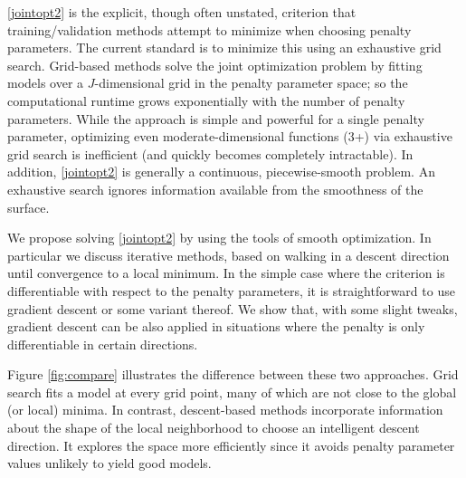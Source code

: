 \documentclass[12pt,letterpaper]{article}
\begin{document}
\eqref{jointopt2} is the explicit, though often unstated, criterion that training/validation methods attempt to minimize when choosing penalty parameters. The current standard is to minimize this using an exhaustive grid search. Grid-based methods solve the joint optimization problem by fitting models over a $J$-dimensional grid in the penalty parameter space; so the computational runtime grows exponentially with the number of penalty parameters. While the approach is simple and powerful for a single penalty parameter, optimizing even moderate-dimensional functions (3+) via exhaustive grid search is inefficient (and quickly becomes completely intractable).  In addition, \eqref{jointopt2} is generally a continuous, piecewise-smooth problem. An exhaustive search ignores information available from the smoothness of the surface.

We propose solving \eqref{jointopt2} by using the tools of smooth optimization. In particular we discuss iterative methods, based on walking in a descent direction until convergence to a local minimum. In the simple case where the criterion is differentiable with respect to the penalty parameters, it is straightforward to use gradient descent or some variant thereof. We show that, with some slight tweaks, gradient descent can be also applied in situations where the penalty is only differentiable in certain directions.

Figure \ref{fig:compare} illustrates the difference between these two approaches. Grid search fits a model at every grid point, many of which are not close to the global (or local) minima. In contrast, descent-based methods incorporate information about the shape of the local neighborhood to choose an intelligent descent direction. It explores the space more efficiently since it avoids penalty parameter values unlikely to yield good models.
\end{document}
